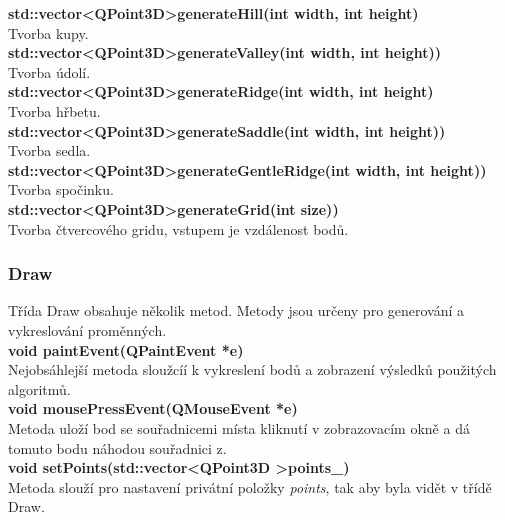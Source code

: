 \documentclass[a4paper,11pt,twoside]{article}
\begin{document}
\noindent\textbf{std::vector\textless QPoint3D\textgreater generateHill(int width, int height)}\\
Tvorba kupy.\\

\noindent\textbf{std::vector\textless QPoint3D\textgreater generateValley(int width, int height))}\\
Tvorba údolí.\\

\noindent\textbf{std::vector\textless QPoint3D\textgreater generateRidge(int width, int height)}\\
Tvorba hřbetu.\\

\noindent\textbf{std::vector\textless QPoint3D\textgreater generateSaddle(int width, int height))}\\
Tvorba sedla.\\

\noindent\textbf{std::vector\textless QPoint3D\textgreater generateGentleRidge(int width, int height))}\\
Tvorba spočinku.\\

\noindent\textbf{std::vector\textless QPoint3D\textgreater generateGrid(int size))}\\
Tvorba čtvercového gridu, vstupem je vzdálenost bodů.\\

\subsubsection{Draw}

Třída Draw obsahuje několik metod. Metody jsou určeny pro generování a vykreslování proměnných.\\

\noindent\textbf{void paintEvent(QPaintEvent *e)}\\
Nejobsáhlejší metoda sloužcíí k vykreslení bodů a zobrazení výsledků použitých algoritmů.\\

\noindent\textbf{void mousePressEvent(QMouseEvent *e)}\\
Metoda uloží bod se souřadnicemi místa kliknutí v zobrazovacím okně a dá tomuto bodu náhodou souřadnici z.\\

\noindent\textbf{void setPoints(std::vector\textless QPoint3D \textgreater points\_)}\\
Metoda slouží pro nastavení privátní položky \textit{points}, tak aby byla vidět v třídě Draw.\\
\end{document}
